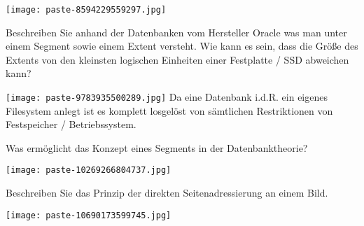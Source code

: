 \documentclass{article}
\begin{document}
\begin{tcolorbox}[colback=white!10!white,colframe=lightgray!75!black,
  savelowerto=\jobname_ex.tex]

\begin{center}
\texttt{[image: paste-8594229559297.jpg]}

\end{center}

\tcblower

\justifying

\end{tcolorbox}
\begin{tcolorbox}[colback=white!10!white,colframe=lightgray!75!black,
  savelowerto=\jobname_ex.tex]

\begin{center}
 Beschreiben Sie anhand der Datenbanken vom Hersteller 
Oracle
was man unter einem 
Segment 
sowie einem 
Extent 
versteht. Wie kann es sein, dass die Größe des 
Extents 
von den kleinsten logischen Einheiten einer Festplatte / SSD abweichen kann? 

\end{center}

\tcblower

\justifying
\texttt{[image: paste-9783935500289.jpg]}
Da eine Datenbank i.d.R. ein eigenes Filesystem anlegt ist es komplett losgelöst von sämtlichen Restriktionen von Festspeicher / Betriebssystem.

\end{tcolorbox}
\begin{tcolorbox}[colback=white!10!white,colframe=lightgray!75!black,
  savelowerto=\jobname_ex.tex]

\begin{center}
 Was ermöglicht das Konzept eines 
Segments
in der Datenbanktheorie? 

\end{center}

\tcblower

\justifying
\texttt{[image: paste-10269266804737.jpg]}

\end{tcolorbox}
\begin{tcolorbox}[colback=white!10!white,colframe=lightgray!75!black,
  savelowerto=\jobname_ex.tex]

\begin{center}
 Beschreiben Sie das Prinzip der 
direkten
Seitenadressierung an einem Bild. 

\end{center}

\tcblower

\justifying
\texttt{[image: paste-10690173599745.jpg]}

\end{tcolorbox}
\end{document}
